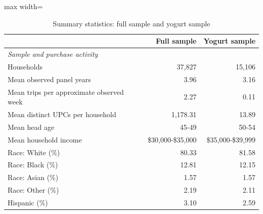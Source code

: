 \begin{table}[htbp]\centering\small
\centering
\caption{Summary statistics: full sample and yogurt sample}
\label{tab:full-panel-vs-yogurt}
\begin{adjustbox}{max width=\linewidth}
\begin{tabular}{lrr}
\toprule
 & Full sample & Yogurt sample \\
\midrule
\multicolumn{3}{l}{\textit{Sample and purchase activity}} \\
Households & 37,827 & 15,106 \\
Mean observed panel years & 3.96 & 3.16 \\
Mean trips per approximate observed week & 2.27 & 0.11 \\
Mean distinct UPCs per household & 1,178.31 & 13.89 \\
Mean head age  & 45-49 & 50-54 \\
Mean household income & \$30,000-\$35,000 & \$35,000-\$39,999 \\
Race: White (\%) & 80.33 & 81.58 \\
Race: Black (\%) & 12.81 & 12.15 \\
Race: Asian (\%) & 1.57 & 1.57 \\
Race: Other (\%) & 2.19 & 2.11 \\
Hispanic (\%) & 3.10 & 2.59 \\
\bottomrule
\end{tabular}
\end{adjustbox}
\end{table}
